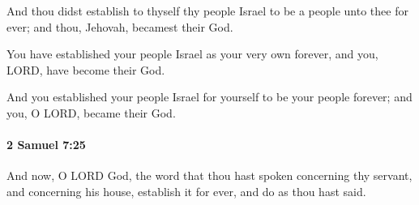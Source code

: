 			\begin{versebox}
					\item[BHS] 
					\item[ASV] And thou didst establish to thyself thy people Israel to be a people unto thee for ever; and thou, Jehovah, becamest their God.
					\item[NIV] You have established your people Israel as your very own forever, and you, LORD, have become their God.
					\item[NRSV] And you established your people Israel for yourself to be your people forever; and you, O LORD, became their God.
			\end{versebox}

		\paragraph{2 Samuel 7:25} %
			\label{2SAMUEL-7-25}

			And now, O LORD God, the word that thou hast spoken concerning thy servant, and concerning his house, establish it for ever, and do as thou hast said.

